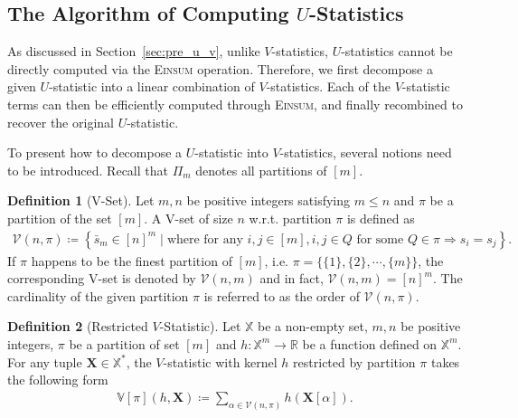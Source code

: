 \documentclass[12pt]{article}
\newcommand{\pdfu}{\texorpdfstring{$U$}{U}}
\theoremstyle{plain}
\theoremstyle{definition}
\newtheorem{definition}{Definition}
\def\Einsum{\textsc{Einsum}}
\newcommand{\sPi}{\pi}
\newcommand{\vset}{\calV}
\newcommand{\vsetp}[2]{\vset(#1,#2)}
\newcommand{\vstat}{\mathbb{V}}
\newcommand{\partition}{\Pi}
\newcommand{\partitionp}[1]{\partition_{#1}}
\newcommand{\bbR}{{\mathbb{R}}}
\def\bbX{\mathbb{X}}
\def\calV{\mathcal{V}}
\begin{document}
\begin{bibunit}[agsm]
\subsection{The Algorithm of Computing \pdfu{}-Statistics}
\label{sec:alg_u}

As discussed in Section~\ref{sec:pre_u_v}, unlike $V$-statistics, $U$-statistics cannot be directly computed via the \Einsum{} operation. Therefore, we first decompose a given $U$-statistic into a linear combination of $V$-statistics. Each of the $V$-statistic terms can then be efficiently computed through \Einsum{}, and finally recombined to recover the original $U$-statistic.

To present how to decompose a $U$-statistic into $V$-statistics, several notions need to be introduced. Recall that $\partitionp{m}$ denotes all partitions of $[m]$. %

\begin{definition}[V-Set]\label{def:v_set}
     Let $m,n$ be positive integers satisfying $m \leq n$ and $\sPi$ be a partition of the set $[m]$. A V-set of size $n$ w.r.t. partition $\sPi$ is defined as
    \begin{align*}
        \vsetp{n}{\sPi} \coloneqq \left\{ \bar{s}_{m} \in [n]^m \mid \text{where for any $i, j \in [m]$},i, j \in Q \text{ for some $Q \in \sPi$}  \Longrightarrow  s_i = s_j \right\}.
    \end{align*}
    If $\sPi$ happens to be the finest partition of $[m]$, i.e. $\sPi = \{\{1\}, \{2\}, \cdots, \{m\}\}$, the corresponding V-set is denoted by $\vsetp{n}{m}$ and in fact, $\vsetp{n}{m} = [n]^m$. The cardinality of the given partition $\sPi$ is referred to as the order of $\vsetp{n}{\sPi}$.
\end{definition}

\begin{definition}[Restricted $V$-Statistic]\label{def:res_v_stat}
Let $\bbX$ be a non-empty set, $m, n$ be positive integers, $\sPi$ be a partition of set $[m]$ and $h: \bbX^{m} \rightarrow \bbR$ be a function defined on $\bbX^m$. For any tuple $\bm{X} \in \bbX^*$, the $V$-statistic with kernel $h$ restricted by partition $\sPi$ takes the following form 
\begin{align*}
\vstat[\sPi](h,\bm{X}) \coloneqq \sum_{\alpha \in \vsetp{n}{\sPi}} h(\bm{X}[\alpha]). 
\end{align*}
\end{definition}


\end{bibunit}
\end{document}
